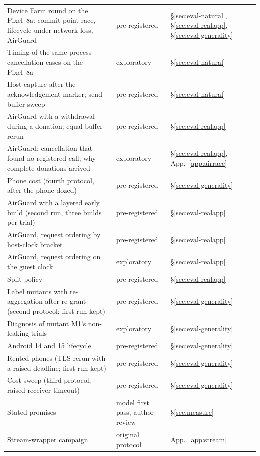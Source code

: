 \begin{table}[t]
\begin{tabular}{@{}>{\raggedright\arraybackslash}p{}>{\raggedright\arraybackslash}p{}l@{}}
Device Farm round on the Pixel~8a: commit-point race, lifecycle under network loss, AirGuard & pre-registered & \S\ref{sec:eval-natural}, \S\ref{sec:eval-realapp}, \S\ref{sec:eval-generality}\\
Timing of the same-process cancellation cases on the Pixel~8a & exploratory & \S\ref{sec:eval-natural}\\
Host capture after the acknowledgement marker; send-buffer sweep & pre-registered & \S\ref{sec:eval-natural}\\
AirGuard with a withdrawal during a donation; equal-buffer rerun & pre-registered & \S\ref{sec:eval-realapp}\\
AirGuard: cancellation that found no registered call; why complete donations arrived & exploratory & \S\ref{sec:eval-realapp}, App.~\ref{app:airrace}\\
Phone cost (fourth protocol, after the phone dozed) & pre-registered & \S\ref{sec:eval-generality}\\
AirGuard with a layered early build (second run, three builds per trial) & pre-registered & \S\ref{sec:eval-realapp}\\
AirGuard, request ordering by host-clock bracket & pre-registered & \S\ref{sec:eval-realapp}\\
AirGuard, request ordering on the guest clock & exploratory & \S\ref{sec:eval-realapp}\\
Split policy & pre-registered & \S\ref{sec:eval-realapp}\\
Label mutants with re-aggregation after re-grant (second protocol; first run kept) & pre-registered & \S\ref{sec:eval-generality}\\
Diagnosis of mutant M1's non-leaking trials & exploratory & \S\ref{sec:eval-generality}\\
Android 14 and 15 lifecycle & pre-registered & \S\ref{sec:eval-generality}\\
Rented phones (TLS rerun with a raised deadline; first run kept) & pre-registered & \S\ref{sec:eval-generality}\\
Cost sweep (third protocol, raised receiver timeout) & pre-registered & \S\ref{sec:eval-generality}\\
Stated promises & model first pass, author review & \S\ref{sec:measure}\\
Stream-wrapper campaign & original protocol & App.~\ref{app:stream}\\
\bottomrule\end{tabular}\end{table}


